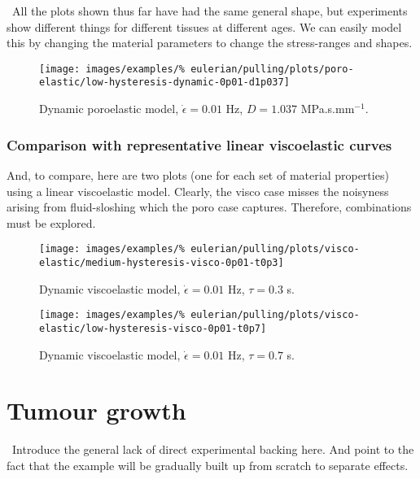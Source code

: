 \textbullet\ All the plots shown thus far have had the same general
shape, but experiments show different things for different tissues at
different ages. We can easily model this by changing the material
parameters to change the stress-ranges and shapes.

\begin{figure}[!hptb]
\centering
\texttt{[image: images/examples/\%
eulerian/pulling/plots/poro-elastic/low-hysteresis-dynamic-0p01-d1p037]}
\caption{Dynamic poroelastic model, $\dot{\epsilon}=0.01$ Hz, $D=1.037$
  MPa.s.mm$^{-1}$.}
\label{low-hysteresis-dynamic-0p01-d1p037}
\end{figure}

\subsubsection{Comparison with representative linear viscoelastic
  curves}
\label{viscoelastic-hysteresis}

And, to compare, here are two plots (one for each set of material
properties) using a linear viscoelastic model. Clearly, the visco case
misses the noisyness arising from fluid-sloshing which the poro case
captures. Therefore, combinations must be explored.

\begin{figure}[!hptb]
\centering
\texttt{[image: images/examples/\%
eulerian/pulling/plots/visco-elastic/medium-hysteresis-visco-0p01-t0p3]}
\caption{Dynamic viscoelastic model, $\dot{\epsilon}=0.01$ Hz,
  $\tau=0.3$ s.}
\label{medium-hysteresis-visco-0p01-t0p3}
\end{figure}

\begin{figure}[!hptb]
\centering
\texttt{[image: images/examples/\%
eulerian/pulling/plots/visco-elastic/low-hysteresis-visco-0p01-t0p7]}
\caption{Dynamic viscoelastic model, $\dot{\epsilon}=0.01$ Hz,
  $\tau=0.7$ s.}
\label{low-hysteresis-visco-0p01-t0p7}
\end{figure}

\clearpage

\section{Tumour growth}
\label{tumour-growth}

\textbullet\ Introduce the general lack of direct experimental
backing here. And point to the fact that the example will be gradually
built up from scratch to separate effects.


